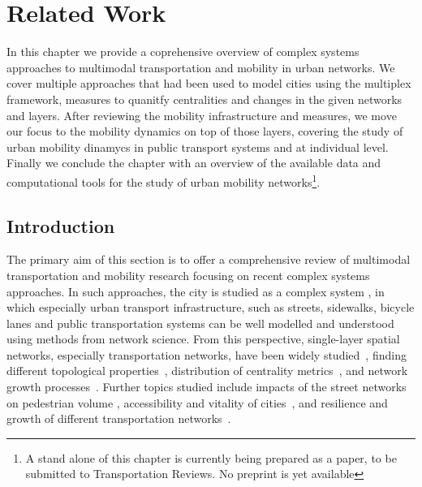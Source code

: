 \chapter{Related Work}\label{ch:litReview}

In this chapter we provide a coprehensive overview of complex systems approaches to multimodal transportation and mobility in urban networks. We cover multiple approaches that had been used to model cities using the multiplex framework, measures to quanitfy centralities and changes in the given networks and layers. After reviewing the mobility infrastructure and measures, we move our focus to the mobility dynamics on top of those layers, covering the study of urban mobility dinamycs in public transport systems and at individual level. Finally we conclude the chapter with an overview of the available data and computational tools for the study of urban mobility networks\footnote{A stand alone of this chapter is currently being prepared as a paper, to be submitted to Transportation Reviews. No preprint is yet available}.

\section{Introduction}
The primary aim of this section is to offer a comprehensive review of multimodal transportation and mobility research focusing on recent complex systems approaches. In such approaches, the city is studied as a complex system \cite{batty2013new,lobo2020urban}, in which especially urban transport infrastructure, such as streets, sidewalks, bicycle lanes and public transportation systems can be well modelled and understood using methods from network science. From this perspective, single-layer spatial networks, especially transportation networks, have been widely studied~\cite{lin2013complex,barthelemy2011spatial,ding2019application}, finding different topological properties~\cite{jiang2004topological,cardillo2006structural,barthelemy2008patterns,batty2008size,barthelemy2011spatial,strano2013comparative,louf2014typology,boeing2020multiscale}, distribution of centrality metrics~\cite{crucitti2008centrality,boeing2018planarity,kirkley2018structural}, and network growth processes~\cite{makse1995growth,strano2012evolution}. Further topics studied include impacts of the street networks on pedestrian volume \cite{hajrasouliha2015connectivity}, accessibility and vitality of cities~\cite{denadai2016death,biazzo2019accesibility,natera2019walkability}, and resilience and growth of different transportation networks~\cite{baggag2018resilience,ferretti2019resilience,natera2020growth}. %

